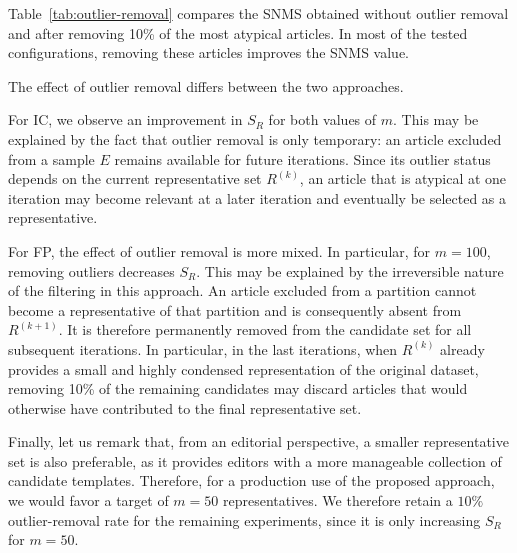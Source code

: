 \documentclass{ieeeaccess}
\newcommand{\toblack}{\color{black}}
\newcommand{\toblue}{\color{blue}}
\newcommand{\ga}[1]{{\toblue [{\bfseries Gillian}: {\itshape #1}] \toblack}}
\newcommand{\partitioning}{FP\xspace}
\newcommand{\inclusion}{IC\xspace}
\begin{document}
Table~\ref{tab:outlier-removal} compares the SNMS obtained without outlier removal and after removing 10\% of the most atypical articles. In most of the tested configurations, removing these articles improves the SNMS value. 


The effect of outlier removal differs between the two approaches.

For \inclusion, we observe an improvement in $S_R$ for both values of $m$. This may be explained by the fact that outlier removal is only temporary: an article excluded from a sample $E$ remains available for future iterations. Since its outlier status depends on the current representative set $R^{(k)}$, an article that is atypical at one iteration may become relevant at a later iteration and eventually be selected as a representative.

For \partitioning, the effect of outlier removal is more mixed. In particular, for $m=100$, removing outliers decreases $S_R$. This may be explained by the irreversible nature of the filtering in this approach. An article excluded from a partition cannot become a representative of that partition and is consequently absent from $R^{(k+1)}$. It is therefore permanently removed from the candidate set for all subsequent iterations. In particular, in the last iterations, when $R^{(k)}$ already provides a small and highly condensed representation of the original dataset, removing 10\% of the remaining candidates may discard articles that would otherwise have contributed to the final representative set.

Finally, let us remark that, from an editorial perspective, a smaller representative set is also preferable, as it provides editors with a more manageable collection of candidate templates. Therefore, for a production use of the proposed approach, we would favor a target of $m=50$ representatives. We therefore retain a $10\%$ outlier-removal rate for the remaining experiments, since it is only increasing $S_R$ for $m=50$.
\end{document}
